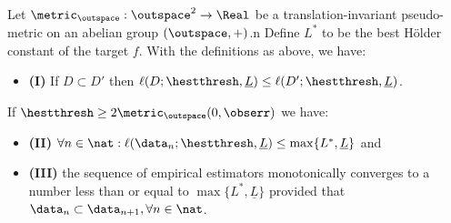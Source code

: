 \begin {lem} \label{lem:constadaptation_boundedness} Let $\metric_\outspace: \outspace^2 \to \Real$ be a translation-invariant pseudo-metric on an abelian group $(\outspace,+)$.n Define $L^*$ to be the best H\"older constant of the target $f$.
With the definitions as above, we have:
\begin{itemize}
\item \textbf{(I)} If $D \subset D'$ then $\ell(D;\hestthresh,\underline L) \leq \ell(D';\hestthresh,\underline L)$.
\end{itemize}
If $\hestthresh \geq 2 \metric_\outspace(0,\obserr)$ we have:
\begin{itemize}
\item \textbf{(II)} $\forall n \in \nat: \ell(\data_n; \hestthresh,\underline L) \leq \max\{L^*,\underline L\}$ and  
\item \textbf{(III)} the sequence  of empirical estimators monotonically converges to a number less than or equal to $\max\{L^*,\underline L\}$ provided that $\data_{n} \subset \data_{n+1}, \forall n \in \nat$.
\end{itemize}
\end{lem}
